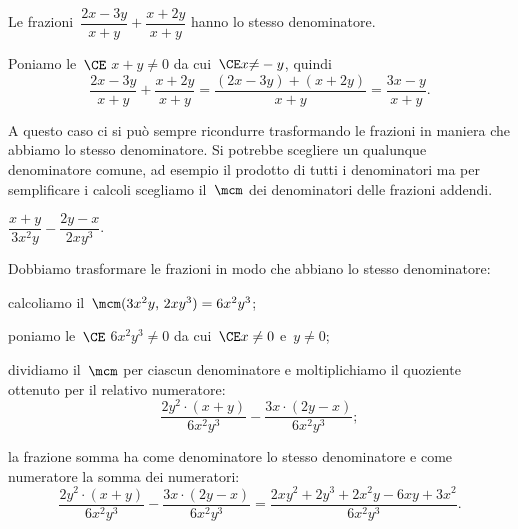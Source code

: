 \begin{exrig}
 \begin{esempio}
Le frazioni~$\dfrac{2x-3y}{x+y}+\dfrac{x+2y}{x+y}$ hanno lo stesso denominatore.

Poniamo le~$\CE$ $x + y{\neq}0$ da cui~$\CE x{\neq}-y$, quindi
\begin{equation*}
\frac{2x-3y}{x+y}+\frac{x+2y}{x+y}=\frac{(2x-3y)+(x+2y)}{x+y}=\frac{3x-y}{x+y}.
\end{equation*}
 \end{esempio}
\osservazione A questo caso ci si può sempre ricondurre trasformando le frazioni in maniera che abbiamo lo stesso denominatore. Si potrebbe scegliere un qualunque denominatore comune,
ad esempio il prodotto di tutti i denominatori ma per semplificare i calcoli scegliamo il~$\mcm$ dei denominatori delle frazioni addendi.

 \begin{esempio}
$\dfrac{x+y}{3x^{2}y}-\dfrac{2y-x}{2xy^{3}}$.

Dobbiamo trasformare le frazioni in modo che abbiano lo stesso denominatore:
\begin{itemize*}
 \item calcoliamo il~$\mcm(3x^{2}y\text{,~}2xy^{3}) = 6x^{2}y^{3}$;
 \item poniamo le~$\CE$ $6x^{2}y^{3} \neq 0$ da cui~$\CE x \neq 0$ e~$y \neq 0$;
 \item dividiamo il~$\mcm$ per ciascun denominatore e moltiplichiamo il quoziente ottenuto per il relativo numeratore:
    \[\frac{2y^{2}\cdot(x+y)}{6x^{2}y^{3}}-\frac{3x\cdot(2y-x)}{6x^{2}y^{3}};\]
 \item la frazione somma ha come denominatore lo stesso denominatore e come numeratore la somma dei numeratori:
    \begin{equation*}
    \frac{2y^{2}\cdot(x+y)}{6x^{2}y^{3}}-\frac{3x\cdot(2y-x)}{6x^{2}y^{3}}=
    \frac{2xy^{2}+2y^{3}+2x^{2}y-6xy+3x^{2}}{6x^{2}y^{3}}.
    \end{equation*}
\end{itemize*}
 \end{esempio}


\end{exrig}
